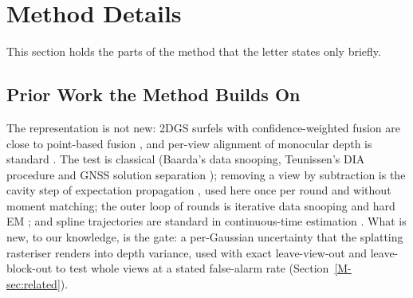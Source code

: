 \section{Method Details}
\label{sup:method}
This section holds the parts of the method that the letter states only briefly.

\subsection{Prior Work the Method Builds On}
The representation is not new: 2DGS surfels \cite{gs_2dgs} with confidence-weighted fusion are close to
point-based fusion \cite{fus_keller_surfels}, and per-view alignment of monocular depth is standard
\cite{rec_monosdf}. The test is classical (Baarda's data snooping, Teunissen's DIA procedure
\cite{stat_teunissen_dia} and GNSS solution separation \cite{flt_raim_joerger}); removing a view by
subtraction is the cavity step of expectation propagation \cite{mp_minka_ep}, used here once per round
and without moment matching; the outer loop of rounds is iterative data snooping and hard EM
\cite{stat_dempster_em}; and spline trajectories are standard in continuous-time estimation
\cite{traj_furgale_basis}. What is new, to our knowledge, is the gate: a per-Gaussian uncertainty that
the splatting rasteriser renders into depth variance, used with exact leave-view-out and leave-block-out
to test whole views at a stated false-alarm rate (Section~\ref{M-sec:related}).

